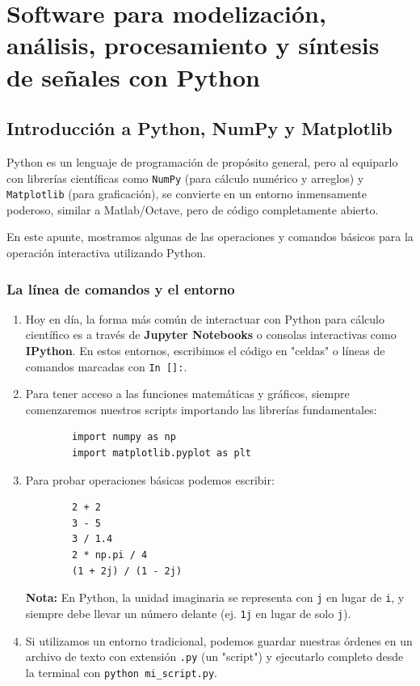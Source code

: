 \chapter{Software para modelización, análisis, procesamiento y síntesis de señales con Python}

\section{Introducción a Python, NumPy y Matplotlib}

Python es un lenguaje de programación de propósito general, pero al equiparlo con librerías científicas como \texttt{NumPy} (para cálculo numérico y arreglos) y \texttt{Matplotlib} (para graficación), se convierte en un entorno inmensamente poderoso, similar a Matlab/Octave, pero de código completamente abierto.

En este apunte, mostramos algunas de las operaciones y comandos básicos para la operación interactiva utilizando Python.

\subsection{La línea de comandos y el entorno}

\begin{enumerate}
	
	\item Hoy en día, la forma más común de interactuar con Python para cálculo científico es a través de \textbf{Jupyter Notebooks} o consolas interactivas como \textbf{IPython}. En estos entornos, escribimos el código en "celdas" o líneas de comandos marcadas con \verb-In []:-.
	
	\item Para tener acceso a las funciones matemáticas y gráficos, siempre comenzaremos nuestros scripts importando las librerías fundamentales:
	\begin{verbatim}
		import numpy as np
		import matplotlib.pyplot as plt
	\end{verbatim}
	
	\item Para probar operaciones básicas podemos escribir:
	\begin{verbatim}
		2 + 2
		3 - 5
		3 / 1.4
		2 * np.pi / 4
		(1 + 2j) / (1 - 2j)
	\end{verbatim}
	\textbf{Nota:} En Python, la unidad imaginaria se representa con \texttt{j} en lugar de \texttt{i}, y siempre debe llevar un número delante (ej. \texttt{1j} en lugar de solo \texttt{j}).
	
	\item Si utilizamos un entorno tradicional, podemos guardar nuestras órdenes en un archivo de texto con extensión \texttt{.py} (un "script") y ejecutarlo completo desde la terminal con \texttt{python mi\_script.py}.
\end{enumerate}


